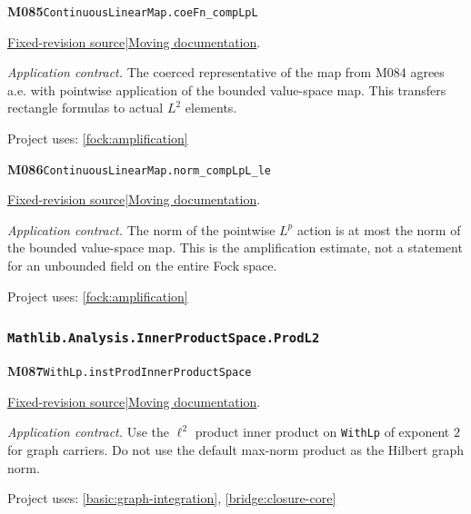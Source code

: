 \documentclass[11pt,a4paper]{article}
\theoremstyle{definition}
\theoremstyle{remark}
\begin{document}
\noindent\textbf{M085}\label{base:M085}\quad\nolinkurl{ContinuousLinearMap.coeFn_compLpL}

\href{https://github.com/leanprover-community/mathlib4/blob/9bac2d0692944a775113f7c130fd5e5b4608a854/Mathlib/MeasureTheory/Function/LpSpace/Basic.lean}{Fixed-revision source}\quad|\quad\href{https://leanprover-community.github.io/mathlib4_docs/Mathlib/MeasureTheory/Function/LpSpace/Basic.html#ContinuousLinearMap.coeFn_compLpL}{Moving documentation}.\par
\noindent\textit{Application contract.} The coerced representative of the map from M084 agrees a.e. with pointwise application of the bounded value-space map. This transfers rectangle formulas to actual $L^2$ elements.\par
{\small Project uses: \ref{fock:amplification}}\par\medskip

\noindent\textbf{M086}\label{base:M086}\quad\nolinkurl{ContinuousLinearMap.norm_compLpL_le}

\href{https://github.com/leanprover-community/mathlib4/blob/9bac2d0692944a775113f7c130fd5e5b4608a854/Mathlib/MeasureTheory/Function/LpSpace/Basic.lean}{Fixed-revision source}\quad|\quad\href{https://leanprover-community.github.io/mathlib4_docs/Mathlib/MeasureTheory/Function/LpSpace/Basic.html#ContinuousLinearMap.norm_compLpL_le}{Moving documentation}.\par
\noindent\textit{Application contract.} The norm of the pointwise $L^p$ action is at most the norm of the bounded value-space map. This is the amplification estimate, not a statement for an unbounded field on the entire Fock space.\par
{\small Project uses: \ref{fock:amplification}}\par\medskip

\subsubsection*{\nolinkurl{Mathlib.Analysis.InnerProductSpace.ProdL2}}
\noindent\textbf{M087}\label{base:M087}\quad\nolinkurl{WithLp.instProdInnerProductSpace}

\href{https://github.com/leanprover-community/mathlib4/blob/9bac2d0692944a775113f7c130fd5e5b4608a854/Mathlib/Analysis/InnerProductSpace/ProdL2.lean}{Fixed-revision source}\quad|\quad\href{https://leanprover-community.github.io/mathlib4_docs/Mathlib/Analysis/InnerProductSpace/ProdL2.html#WithLp.instProdInnerProductSpace}{Moving documentation}.\par
\noindent\textit{Application contract.} Use the $\ell^2$ product inner product on \nolinkurl{WithLp} of exponent $2$ for graph carriers. Do not use the default max-norm product as the Hilbert graph norm.\par
{\small Project uses: \ref{basic:graph-integration}, \ref{bridge:closure-core}}\par\medskip
\end{document}
